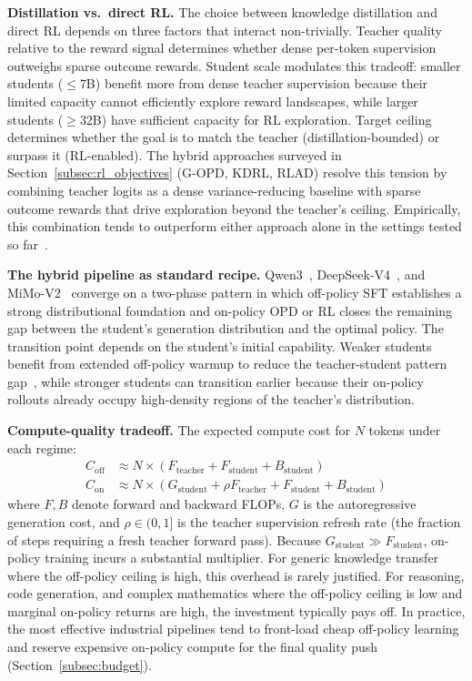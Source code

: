 \documentclass{article} %
\begin{document}
\textbf{Distillation vs.\ direct RL.} The choice between knowledge distillation and direct RL depends on three factors that interact non-trivially. Teacher quality relative to the reward signal determines whether dense per-token supervision outweighs sparse outcome rewards. Student scale modulates this tradeoff: smaller students ($\le$7B) benefit more from dense teacher supervision because their limited capacity cannot efficiently explore reward landscapes, while larger students ($\ge$32B) have sufficient capacity for RL exploration. Target ceiling determines whether the goal is to match the teacher (distillation-bounded) or surpass it (RL-enabled). The hybrid approaches surveyed in Section~\ref{subsec:rl_objectives} (G-OPD, KDRL, RLAD) resolve this tension by combining teacher logits as a dense variance-reducing baseline with sparse outcome rewards that drive exploration beyond the teacher's ceiling. Empirically, this combination tends to outperform either approach alone in the settings tested so far~\citep{2602.12125,2506.02208,2602.22495}.

\textbf{The hybrid pipeline as standard recipe.} Qwen3~\citep{2505.09388}, DeepSeek-V4~\citep{deepseekv4}, and MiMo-V2~\citep{2601.02780} converge on a two-phase pattern in which off-policy SFT establishes a strong distributional foundation and on-policy OPD or RL closes the remaining gap between the student's generation distribution and the optimal policy. The transition point depends on the student's initial capability. Weaker students benefit from extended off-policy warmup to reduce the teacher-student pattern gap~\citep{li2026rethinking}, while stronger students can transition earlier because their on-policy rollouts already occupy high-density regions of the teacher's distribution.

\textbf{Compute-quality tradeoff.} The expected compute cost for $N$ tokens under each regime:
\begin{align}
    C_{\text{off}} &\approx N \times (F_{\text{teacher}} + F_{\text{student}} + B_{\text{student}}) \\
    C_{\text{on}} &\approx N \times \left( G_{\text{student}} + \rho F_{\text{teacher}} + F_{\text{student}} + B_{\text{student}} \right)
\end{align}
where $F, B$ denote forward and backward FLOPs, $G$ is the autoregressive generation cost, and $\rho \in (0, 1]$ is the teacher supervision refresh rate (the fraction of steps requiring a fresh teacher forward pass). Because $G_{\text{student}} \gg F_{\text{student}}$, on-policy training incurs a substantial multiplier. For generic knowledge transfer where the off-policy ceiling is high, this overhead is rarely justified. For reasoning, code generation, and complex mathematics where the off-policy ceiling is low and marginal on-policy returns are high, the investment typically pays off. In practice, the most effective industrial pipelines tend to front-load cheap off-policy learning and reserve expensive on-policy compute for the final quality push (Section~\ref{subsec:budget}).
\end{document}
